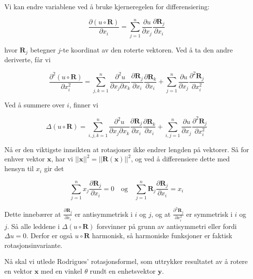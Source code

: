 Vi kan endre variablene ved å bruke kjerneregelen for differensiering:

\begin{equation*}
\frac{\partial (u \circ \mathbf{R})}{\partial x_i} = \sum_{j=1}^{n} \frac{\partial u}{\partial x_j} \frac{\partial \mathbf{R}_j}{\partial x_i}
\end{equation*}

hvor $\mathbf{R}_j$ betegner $j$-te koordinat av den roterte vektoren. Ved å ta den andre deriverte, får vi

\begin{equation*}
\frac{\partial^2 (u \circ \mathbf{R})}{\partial x_i^2} = \sum_{j,k=1}^{n} \frac{\partial^2 u}{\partial x_j \partial x_k} \frac{\partial \mathbf{R}_j}{\partial x_i} \frac{\partial \mathbf{R}_k}{\partial x_i} + \sum_{j=1}^{n} \frac{\partial u}{\partial x_j} \frac{\partial^2 \mathbf{R}_j}{\partial x_i^2}
\end{equation*}

Ved å summere over $i$, finner vi

\begin{equation*}
\Delta (u \circ \mathbf{R}) = \sum_{i,j,k=1}^{n} \frac{\partial^2 u}{\partial x_j \partial x_k} \frac{\partial \mathbf{R}_j}{\partial x_i} \frac{\partial \mathbf{R}_k}{\partial x_i} + \sum_{i,j=1}^{n} \frac{\partial u}{\partial x_j} \frac{\partial^2 \mathbf{R}_j}{\partial x_i^2}
\end{equation*}

Nå er den viktigste innsikten at rotasjoner ikke endrer lengden på vektorer. Så for enhver vektor $\mathbf{x}$, har vi $||\mathbf{x}||^2 = ||\mathbf{R}(\mathbf{x})||^2$, og ved å differensiere dette med hensyn til $x_i$ gir det

\begin{equation*}
\sum_{j=1}^{n} x_j \frac{\partial \mathbf{R}_j}{\partial x_i} = 0 \quad \text{og} \quad \sum_{j=1}^{n} \mathbf{R}_j \frac{\partial \mathbf{R}_j}{\partial x_i} = x_i
\end{equation*}

Dette innebærer at $\frac{\partial \mathbf{R}_j}{\partial x_i}$ er antisymmetrisk i $i$ og $j$, og at $\frac{\partial^2 \mathbf{R}_j}{\partial x_i^2}$ er symmetrisk i $i$ og $j$. Så alle leddene i $\Delta (u \circ \mathbf{R})$ forsvinner på grunn av antisymmetri eller fordi $\Delta u = 0$. Derfor er også $u \circ \mathbf{R}$ harmonisk, så harmoniske funksjoner er faktisk rotasjonsinvariante.

Nå skal vi utlede Rodrigues' rotasjonsformel, som uttrykker resultatet av å rotere en vektor $\mathbf{x}$ med en vinkel $\theta$ rundt en enhetsvektor $\mathbf{y}$.

